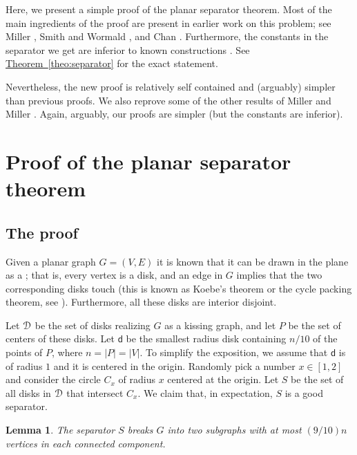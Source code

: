 \documentclass[12pt]{article}
\newtheorem{lemma}[theorem]{Lemma}
\theoremstyle{remark}\theoremheaderfont{\sf}\theorembodyfont{\upshape}\newtheorem{defn}[theorem]{Definition}
\newcommand{\HLink}[2]{\hyperref[#2]{#1~\ref*{#2}}}
\newcommand{\seclab}[1]{\label{sec:#1}}
\newcommand{\lemlab}[1]{\label{lemma:#1}}
\newcommand{\thmref}[1]{\HLink{Theorem}{theo:#1}}
\newcommand{\DSet}{\EuScript{D}}\newcommand{\PntSet}{{P}}\newcommand{\disk}{\mathsf{d}}\newcommand{\diskA}{\mathsf{f}}\newcommand{\diskB}{\mathsf{u}}\newcommand{\diskC}{\mathsf{v}}\newcommand{\pnt}{\mathsf{p}}\newcommand{\pntA}{\mathsf{q}}\newcommand{\pntB}{\mathsf{t}}\newcommand{\AreaX}[1]{\mathrm{area}\pth{#1}}
\newcommand{\Graph}{{G}}
\newcommand{\pth}[1]{\mleft({#1}\mright)}
\newcommand{\emphi}[1]{\emphic{#1}{#1}}
\newcommand{\cardin}[1]{\left| {#1} \right|}\newcommand{\norm}[1]{\left\| {#1} \right\|}
\begin{document}
Here, we present a simple proof of the planar separator theorem.  Most
of the main ingredients of the proof are present in earlier work on
this problem; see Miller \etal \cite{mttv-sspnng-97}, Smith and
Wormald \cite{sw-gsta-98}, and Chan \cite{c-ptasp-03}. Furthermore,
the constants in the separator we get are inferior to known
constructions \cite{ast-ps-94}. See \thmref{separator} for the exact
statement.


Nevertheless, the new proof is relatively self contained and
(arguably) simpler than previous proofs.  We also reprove some of the
other results of Miller \etal \cite{mttv-sspnng-97} and Miller
\cite{m-fsscs-86}. Again, arguably, our proofs are simpler (but the
constants are inferior).

\section{Proof of the planar separator theorem}

\subsection{The proof}
\seclab{proof}

Given a planar graph $\Graph=(V,E)$ it is known that it can be drawn
in the plane as a \emphi{kissing graph}; that is, every vertex is a
disk, and an edge in $\Graph$ implies that the two corresponding disks
touch (this is known as Koebe's theorem or the cycle packing theorem,
see \cite{pa-cg-95}). Furthermore, all these disks are interior
disjoint.

Let $\DSet$ be the set of disks realizing $\Graph$ as a kissing graph,
and let $\PntSet$ be the set of centers of these disks.  Let $\disk$
be the smallest radius disk containing $n/10$ of the points of
$\PntSet$, where $n= \cardin{\PntSet} = \cardin{V}$. To simplify the
exposition, we assume that $\disk$ is of radius $1$ and it is centered
in the origin. Randomly pick a number $x \in [1,2]$ and consider the
circle $C_x$ of radius $x$ centered at the origin.  Let $S$ be the set
of all disks in $\DSet$ that intersect $C_x$. We claim that, in
expectation, $S$ is a good separator.

\begin{lemma}
    \lemlab{separates}The separator $S$ breaks $\Graph$ into two subgraphs with at most
    $(9/10) n$ vertices in each connected component.
\end{lemma}
\end{document}
